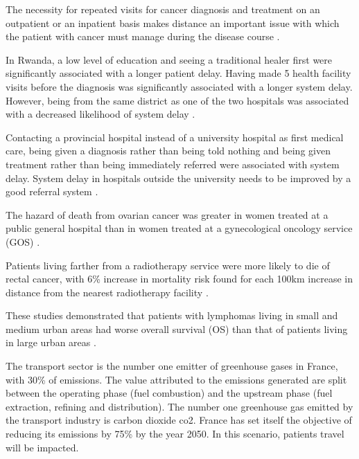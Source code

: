 The necessity for repeated visits for cancer diagnosis and treatment on an outpatient or an inpatient basis makes distance an important issue with which the patient with cancer must manage during the disease course \cite{guidry_transportation_1997}.

In Rwanda, a low level of education and seeing a traditional healer first were significantly associated with a longer patient delay. Having made 5 health facility visits before the diagnosis was significantly associated with a longer system delay. However, being from the same district as one of the two hospitals was associated with a decreased likelihood of system delay \cite{pace_delays_2015}.

Contacting a provincial hospital instead of a university hospital as first medical care, being given a diagnosis rather than being told nothing and being given treatment rather than being immediately referred were associated with system delay. System delay in hospitals outside the university needs to be improved by a good referral system \cite{thongsuksai_delay_2000}.

The hazard of death from ovarian cancer was greater in women treated at a public general hospital than in women treated at a gynecological oncology service (GOS) \cite{tracey_effects_2014}.

Patients living farther from a radiotherapy service were more likely to die of rectal cancer, with 6\% increase in mortality risk found for each 100km increase in distance from the nearest radiotherapy facility \cite{baade_distance_2011}.

\cite{charlton_challenges_2015}
\cite{sabesan_timely_2014}
\cite{dasgupta_variations_2018}
\cite{hall_unequal_2004}
\cite{brundisini_chronic_2013}

These studies demonstrated that patients with lymphomas living in small and medium urban areas had worse overall survival (OS) than that of patients living in large urban areas \cite{lee_effect_2014}.

\cite{sabesan_are_2014}
\cite{sabesan_telemedicine_2012}
\cite{sabesan_timely_2014}
\cite{sabesan_medical_2014}
\cite{mooi_teleoncology_2012}
\cite{bertucci_outpatient_2019}

The transport sector is the number one emitter of greenhouse gases in France, with 30\% of emissions. The value attributed to the emissions generated are split between the operating phase (fuel combustion) and the upstream phase (fuel extraction, refining and distribution). The number one greenhouse gas emitted by the transport industry is carbon dioxide \ac{co2}.
France has set itself the objective of reducing its emissions by 75\% by the year 2050. In this scenario, patients travel will be impacted.

